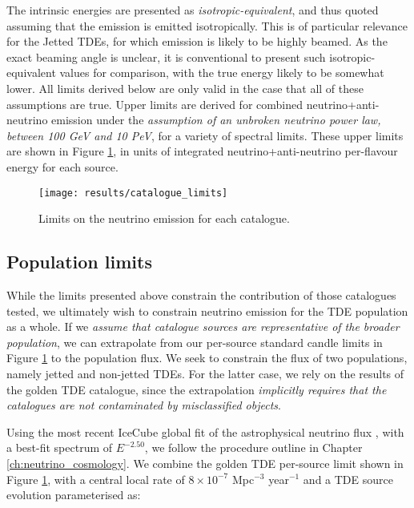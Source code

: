 The intrinsic energies are presented as \emph{isotropic-equivalent}, and thus quoted assuming that the emission is emitted isotropically. This is of particular relevance for the Jetted TDEs, for which emission is likely to be highly beamed. As the exact beaming angle is unclear, it is conventional to present such isotropic-equivalent values for comparison, with the true energy likely to be somewhat lower. All limits derived below are only valid in the case that all of these assumptions are true. Upper limits are derived for combined neutrino+anti-neutrino emission under the \emph{assumption of an unbroken neutrino power law, between 100 GeV and 10 PeV}, for a variety of spectral limits. These upper limits are shown in Figure \ref{fig:cat_upper_limit}, in units of integrated neutrino+anti-neutrino per-flavour energy for each source. 

\begin{figure}[!ht]
	\centering \texttt{[image: results/catalogue\_limits]}
	\caption{Limits on the neutrino emission for each catalogue.}
	\label{fig:cat_upper_limit}
\end{figure}

\subsection*{Population limits}

While the limits presented above constrain the contribution of those catalogues tested, we ultimately wish to constrain neutrino emission for the TDE population as a whole. If we \emph{assume that catalogue sources are representative of the broader population}, we can extrapolate from our per-source standard candle limits in Figure \ref{fig:cat_upper_limit} to the population flux. We seek to constrain the flux of two populations, namely jetted and non-jetted TDEs. For the latter case, we rely on the results of the golden TDE catalogue, since the extrapolation \emph{implicitly requires that the catalogues are not contaminated by misclassified objects}.

Using the most recent IceCube global fit of the astrophysical neutrino flux , with a best-fit spectrum of $E^{-2.50}$, we follow the procedure outline in Chapter \ref{ch:neutrino_cosmology}. We combine the golden TDE per-source limit shown in Figure \ref{fig:cat_upper_limit}, with a central local rate of $8 \times 10^{-7}$ Mpc$^{-3}$ year$^{-1}$  and a TDE source evolution  parameterised as:


